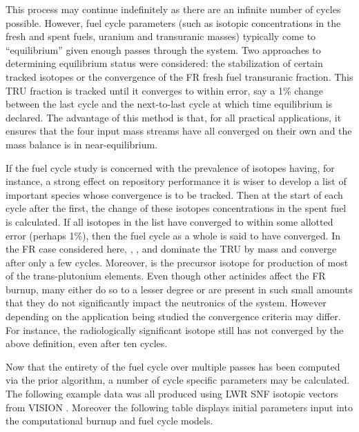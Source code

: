 This process may continue indefinitely as there are an infinite number of cycles possible.  However, 
fuel cycle parameters (such as isotopic concentrations in the fresh and spent fuels, uranium and 
transuranic masses) typically come to ``equilibrium'' given enough passes through the system.  
Two approaches to determining equilibrium status were considered: the stabilization of certain 
tracked isotopes or the convergence of the FR fresh fuel transuranic fraction.   This TRU fraction 
is tracked until it converges to within error, say a 1\% change between the last cycle and the 
next-to-last cycle at which time equilibrium is declared.    The advantage of this method is that, 
for all practical applications, it ensures that the four input mass streams have all converged on 
their own and the mass balance is in near-equilibrium.  

If the fuel cycle study is concerned with the prevalence of isotopes having, for instance, a strong 
effect on repository performance it is wiser to develop a list of important species whose convergence 
is to be tracked.  Then at the start of each cycle after the first, the change of these isotopes 
concentrations in the spent fuel is calculated.  If all isotopes in the list have converged to 
within some allotted error (perhaps 1\%), then the fuel cycle as a whole is said to have converged.   
In the FR case considered here, , , and  dominate the TRU by 
mass and converge after only a few cycles.    Moreover,  is the precursor isotope for 
production of most of the trans-plutonium elements.    Even though other actinides affect the FR 
burnup, many either do so to a lesser degree or are present in such small amounts that they do 
not significantly impact the neutronics of the system.  However depending on the application 
being studied the convergence criteria may differ.  For instance, the radiologically significant 
isotope  still has not converged by the above definition, even after ten cycles.

Now that the entirety of the fuel cycle over multiple passes has been computed via the prior 
algorithm, a number of cycle specific parameters may be calculated.  The following example data 
was all produced using LWR SNF isotopic vectors from VISION \cite{Jacobson2009}. Moreover the following table 
displays initial parameters input into the computational burnup and fuel cycle models.

